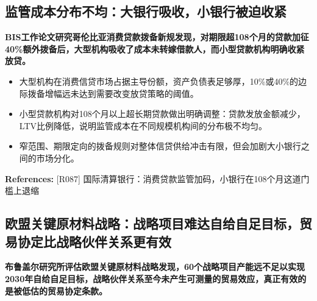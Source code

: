 \documentclass[11pt]{ctexart}
\begin{document}
\subsection{监管成本分布不均：大银行吸收，小银行被迫收紧}
\textbf{BIS工作论文研究哥伦比亚消费贷款拨备新规发现，对期限超108个月的贷款加征40\%额外拨备后，大型机构吸收了成本未转嫁借款人，而小型贷款机构明确收紧放贷。}

\begin{itemize}
  \item 大型机构在消费信贷市场占据主导份额，资产负债表足够厚，10\%或40\%的边际拨备增幅远未达到需要改变放贷策略的阈值。
  \item 小型贷款机构对108个月以上超长期贷款做出明确调整：贷款发放金额减少，LTV比例降低，说明监管成本在不同规模机构间的分布极不均匀。
  \item 窄范围、期限定向的拨备规则对整体信贷供给冲击有限，但会加剧大小银行之间的市场分化。
\end{itemize}
{\small\color{refgray}\textbf{References:} [R087] 国际清算银行：消费贷款监管加码，小银行在108个月这道门槛上退缩}

\subsection{欧盟关键原材料战略：战略项目难达自给自足目标，贸易协定比战略伙伴关系更有效}
\textbf{布鲁盖尔研究所评估欧盟关键原材料战略发现，60个战略项目产能远不足以实现2030年自给自足目标，战略伙伴关系至今未产生可测量的贸易效应，真正有效的是被低估的贸易协定条款。}
\end{document}
